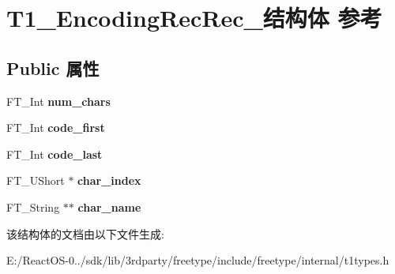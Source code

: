 \hypertarget{struct_t1___encoding_rec_rec__}{}\section{T1\+\_\+\+Encoding\+Rec\+Rec\+\_\+结构体 参考}
\label{struct_t1___encoding_rec_rec__}
\subsection*{Public 属性}
\begin{DoxyCompactItemize}
\item 
\mbox{\label{struct_t1___encoding_rec_rec___af1468d5bad99cccebeb0387713999e9c}} 
F\+T\+\_\+\+Int {\bfseries num\+\_\+chars}
\item 
\mbox{\label{struct_t1___encoding_rec_rec___ae21aad8cbb10c8fd94e9f30c60542662}} 
F\+T\+\_\+\+Int {\bfseries code\+\_\+first}
\item 
\mbox{\label{struct_t1___encoding_rec_rec___a9be1faadf0ce11d12d3bce600e1f2a9d}} 
F\+T\+\_\+\+Int {\bfseries code\+\_\+last}
\item 
\mbox{\label{struct_t1___encoding_rec_rec___a0c00a7b5c5ec7ba5eba667252f11f199}} 
F\+T\+\_\+\+U\+Short $\ast$ {\bfseries char\+\_\+index}
\item 
\mbox{\label{struct_t1___encoding_rec_rec___acf21f77cff90336fb9f297799aaf26eb}} 
F\+T\+\_\+\+String $\ast$$\ast$ {\bfseries char\+\_\+name}
\end{DoxyCompactItemize}


该结构体的文档由以下文件生成\+:\begin{DoxyCompactItemize}
\item 
E\+:/\+React\+O\+S-\/0../sdk/lib/3rdparty/freetype/include/freetype/internal/t1types.\+h\end{DoxyCompactItemize}
